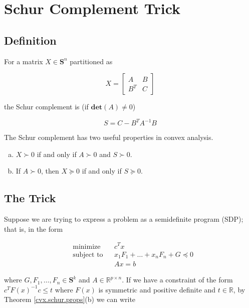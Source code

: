 \section{Schur Complement Trick}\label{cvx.schur.sec}

\subsection{Definition}

For a matrix \(X \in \boldsymbol{S}^n\) partitioned as 

\[
X = \begin{bmatrix} A & B \\ B^T & C\end{bmatrix}
\]

the Schur complement is (if \(\textbf{det}(A) \neq 0\))

\[
S = C - B^TA^{-1} B
\]

The Schur complement has two useful properties in convex analysis.

\begin{theorem}\label{cvx.schur.props}

\begin{enumerate}[(a)]

\item \(X \succ 0\) if and only if \(A \succ 0\) and \(S \succ 0\).

\item If \(A \succ 0\), then \(X \succeq 0\) if and only if \(S \succeq 0\).

\end{enumerate}

\end{theorem}

\subsection{The Trick}

Suppose we are trying to express a problem as a semidefinite program (SDP); that is, in the form

\[
\begin{aligned}
& {\text{minimize}}
& & c^T x \\
& \text{subject to}
& & x_1F_1 + \ldots + x_n F_n + G \preceq 0 \\
& & & Ax = b
\end{aligned}
\]

where \(G, F_1, \ldots, F_n \in \boldsymbol{S}^k\) and \(A \in \mathbb{R}^{p \times n}\). If we have a constraint of the form \(c^TF(x)^{-1}c  \leq t\) where \(F(x)\) is symmetric and positive definite and \(t \in \mathbb{R}\), by Theorem \ref{cvx.schur.props}(b) we can write

